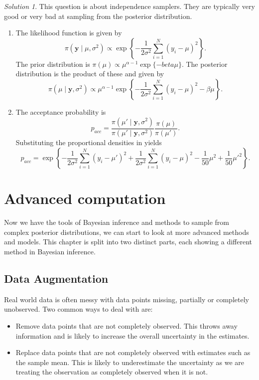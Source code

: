 \documentclass[
]{book}
\providecommand{\tightlist}{%
  \setlength{\itemsep}{0pt}\setlength{\parskip}{0pt}}
\theoremstyle{definition}
\theoremstyle{definition}
\theoremstyle{definition}
\theoremstyle{definition}
\theoremstyle{remark}
\newtheorem*{solution}{Solution}
\begin{document}
\begin{solution}

This question is about independence samplers. They are typically very good or very bad at sampling from the posterior distribution.

\begin{enumerate}
\def\labelenumi{\arabic{enumi}.}
\item
  The likelihood function is given by
  \[
  \pi(\boldsymbol{y} \mid \mu, \sigma^2) \propto \exp\left\{-\frac{1}{2\sigma^2}\sum_{i=1}^N (y_i - \mu)^2 \right\}.
  \]
  The prior distribution is \(\pi(\mu) \propto \mu^{\alpha-1}\exp\{-beta\mu\}\). The posterior distribution is the product of these and given by
  \[
  \pi(\mu \mid \boldsymbol{y}, \sigma^2) \propto \mu^{\alpha-1} \exp\left\{-\frac{1}{2\sigma^2}\sum_{i=1}^N (y_i - \mu)^2  -
   \beta\mu\right\}.
  \]
\item
  The acceptance probability is
  \[
  p_{acc} = \frac{\pi(\mu'\mid \boldsymbol{y}, \sigma^2)}{\pi(\mu'\mid \boldsymbol{y}, \sigma^2)} \frac{\pi(\mu)}{\pi(\mu')}.
  \]
  Substituting the proportional densities in yields
  \[
  p_{acc} = \exp\left\{-\frac{1}{2\sigma^2}\sum_{i=1}^N (y_i - \mu')^2 + \frac{1}{2\sigma^2}\sum_{i=1}^N (y_i - \mu)^2 -\frac{1}{50}\mu^2 + \frac{1}{50}{\mu'}^2 \right\}.
  \]
\end{enumerate}

\end{solution}

\hypertarget{advanced-computation}{%
\chapter{Advanced computation}\label{advanced-computation}}

Now we have the tools of Bayesian inference and methods to sample from complex posterior distributions, we can start to look at more advanced methods and models. This chapter is split into two distinct parts, each showing a different method in Bayesian inference.

\hypertarget{data-augmentation}{%
\section{Data Augmentation}\label{data-augmentation}}

Real world data is often messy with data points missing, partially or completely unobserved. Two common ways to deal with are:

\begin{itemize}
\tightlist
\item
  Remove data points that are not completely observed. This throws away information and is likely to increase the overall uncertainty in the estimates.
\item
  Replace data points that are not completely observed with estimates such as the sample mean. This is likely to underestimate the uncertainty as we are treating the observation as completely observed when it is not.
\end{itemize}
\end{document}
